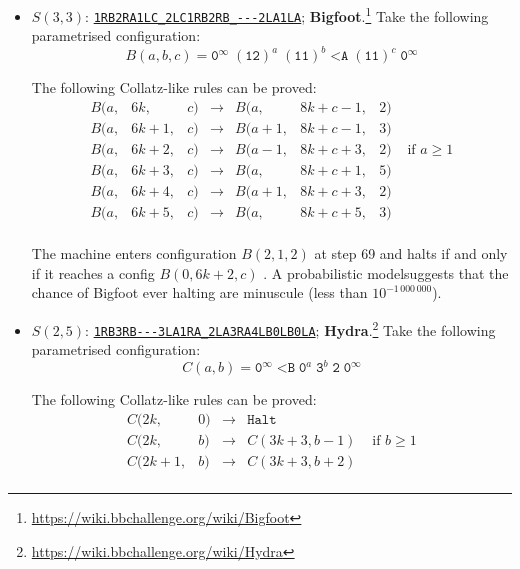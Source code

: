 \documentclass[a4paper,british]{article}
\theoremstyle{definition} %
\numberwithin{equation}{section}
\theoremstyle{definition} %
\newcommand{\tm}[1]{\href{https://bbchallenge.org/#1}{\texttt{\nolinkurl{#1}}}}
\newcommand{\szero}{\texttt{0}\xspace}
\newcommand{\sone}{\texttt{1}\xspace}
\begin{document}
\begin{itemize}
    \item $S(3,3)$: \tm{1RB2RA1LC_2LC1RB2RB_---2LA1LA}; \textbf{Bigfoot}.\footnote{\label{note:bigfoot}\url{https://wiki.bbchallenge.org/wiki/Bigfoot}} Take the following parametrised configuration:
          $$B(a,b,c) = \szero^\infty\; (\sone \texttt{2})^a \; (\sone \sone)^b \; \texttt{<A} \; (\sone \sone)^c \; \szero^\infty$$

          The following Collatz-like rules can be proved:
          \[
              \begin{array}{lllcllll}
                  B(a, & 6k,   & c) & \to & B(a,   & 8k + c - 1, & 2)                        \\
                  B(a, & 6k+1, & c) & \to & B(a+1, & 8k + c - 1, & 3)                        \\
                  B(a, & 6k+2, & c) & \to & B(a-1, & 8k + c + 3, & 2) & \text{ if } a \geq 1 \\
                  B(a, & 6k+3, & c) & \to & B(a,   & 8k + c + 1, & 5)                        \\
                  B(a, & 6k+4, & c) & \to & B(a+1, & 8k + c + 3, & 2)                        \\
                  B(a, & 6k+5, & c) & \to & B(a,   & 8k + c + 5, & 3)                        \\
              \end{array}
          \]

          The machine enters configuration $B(2,1,2)$ at step 69 and halts if and only if it reaches a config $B(0,6k+2,c)$ \cite{ligocki2023bb33}. A probabilistic model suggests that the chance of Bigfoot ever halting are minuscule (less than $10^{-1\,000\,000}$).

    \item $S(2,5)$: \tm{1RB3RB---3LA1RA_2LA3RA4LB0LB0LA}; \textbf{Hydra}.\footnote{\label{note:hydra}\url{https://wiki.bbchallenge.org/wiki/Hydra}} Take the following parametrised configuration:
          $$C(a,b) = \szero^\infty \; \texttt{<B} \; \szero^a \; \texttt{3}^b \; \texttt{2} \; \szero^\infty$$

          The following Collatz-like rules can be proved:
          \[
              \begin{array}{llcll}
                  C(2k,   & 0) & \longrightarrow & \texttt{Halt}                        \\
                  C(2k,   & b) & \longrightarrow & C(3k+3, b-1)  & \text{ if } b \geq 1 \\
                  C(2k+1, & b) & \longrightarrow & C(3k+3, b+2)                         \\
              \end{array}
          \]


\end{itemize}
\end{document}
